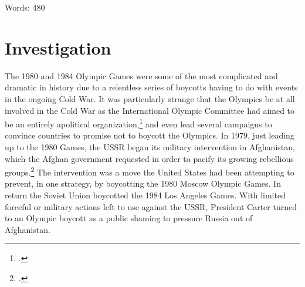 \documentclass[12pt,letterpaper]{article}
\begin{document}
Words: 480

\newpage
\section{Investigation}

The 1980 and 1984 Olympic Games were some of the most complicated and dramatic in history due to a relentless series of boycotts having to do with events in the ongoing Cold War. It was particularly strange that the Olympics be at all involved in the Cold War as the International Olympic Committee had aimed to be an entirely apolitical organization,\footcite[3]{keys_political_2017} and even lead several campaigns to convince countries to promise not to boycott the Olympics. In 1979, just leading up to the 1980 Games, the USSR began its military intervention in Afghanistan, which the Afghan government requested in order to pacify its growing rebellious groups.\footcite[559]{guttmann_cold_1988} The intervention was a move the United States had been attempting to prevent, in one strategy, by boycotting the 1980 Moscow Olympic Games. In return the Soviet Union boycotted the 1984 Los Angeles Games. With limited forceful or military actions left to use against the USSR, President Carter turned to an Olympic boycott as a public shaming to pressure Russia out of Afghanistan. 
\end{document}
